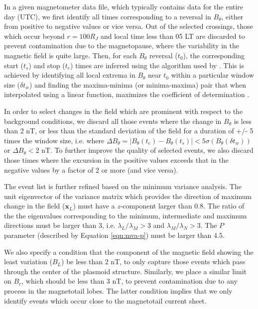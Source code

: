 In a given magnetometer data file, which typically contains data for the entire day (UTC), we first identify all times corresponding to a reversal in $B_\theta$, either from positive to negative values or vice versa. Out of the selected crossings, those which occur beyond $r=100 R_J$ and local time less than 05 LT are discarded to prevent contamination due to the magnetopause, where the variability in the magnetic field is quite large. Then, for each $B_\theta$ reversal ($t_\text{0}$), the corresponding start ($t_s$) and stop ($t_e$) times are inferred using the algorithm used by . This is achieved by identifying all local extrema in $B_\theta$ near $t_0$ within a particular window size ($\delta t_w$) and finding the maxima-minima (or minima-maxima) pair that when interpolated using a linear function, maximizes the coefficient of determination \cite{Smith2017AutomatedIdentification}.

In order to select changes in the field which are prominent with respect to the background conditions, we discard all those events where the change in $B_\theta$ is less than 2 nT, or less than the standard deviation of the field for a duration of +/- 5 times the window size, i.e. where $\Delta B_\theta = |B_\theta(t_e) - B_\theta(t_s)| < 5\sigma ( B_\theta(\delta t_w))$ or $\Delta B_\theta < 2$ nT. To further improve the quality of selected events, we also discard those times where the excursion in the positive values exceeds that in the negative values by a factor of 2 or more (and vice versa). 

The event list is further refined based on the minimum variance analysis. The unit eigenvector of the variance matrix which provides the direction of maximum change in the field ($\mathbf{x}_L$) must have a $z$-component larger than $0.8$. The ratio of the the eigenvalues corresponding to the minimum, intermediate and maximum directions must be larger than 3, i.e. $\lambda_L / \lambda_M > 3$ and $\lambda_M / \lambda_N > 3$. The $P$ parameter (described by Equation \ref{eqn:mva-p}) must be larger than $4.5$. 

We also specify a condition that the component of the magnetic field showing the least variation ($B_L$) be less than 2 nT, to only capture those events which pass through the center of the plasmoid structure. Similarly, we place a similar limit on $B_r$, which should be less than 3 nT, to prevent contamination due to any process in the magnetotail lobes. The latter condition implies that we only identify events which occur close to the magnetotail current sheet.




